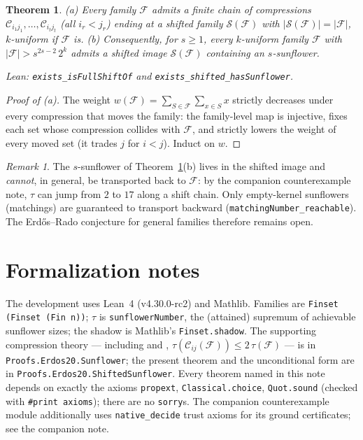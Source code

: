 \documentclass[11pt,a4paper]{article}
\newtheorem{theorem}{Theorem}
\theoremstyle{remark}
\newtheorem{remark}{Remark}
\newcommand{\cC}{\mathcal{C}}
\newcommand{\cF}{\mathcal{F}}
\newcommand{\cS}{\mathcal{S}}
\begin{document}
\begin{theorem}\label{thm:uncond}
\emph{(a)} Every family $\cF$ admits a finite chain of compressions
$\cC_{i_1j_1},\dots,\cC_{i_tj_t}$ (all $i_r<j_r$) ending at a shifted
family $\cS(\cF)$ with $|\cS(\cF)|=|\cF|$, $k$-uniform if $\cF$ is.
\emph{(b)} Consequently, for $s\ge1$, every $k$-uniform family $\cF$
with $|\cF|>s^{2s-2}\,2^{k}$ admits a shifted image $\cS(\cF)$
containing an $s$-sunflower.

\noindent\emph{Lean:} \texttt{exists\_isFullShiftOf} and
\texttt{exists\_shifted\_hasSunflower}.
\end{theorem}

\begin{proof}[Proof of (a)]
The weight $w(\cF)=\sum_{S\in\cF}\sum_{x\in S}x$ strictly decreases
under every compression that moves the family: the family-level map is
injective, fixes each set whose compression collides with $\cF$, and
strictly lowers the weight of every moved set (it trades $j$ for
$i<j$). Induct on $w$.
\end{proof}

\begin{remark}
The $s$-sunflower of Theorem~\ref{thm:uncond}(b) lives in the shifted
image and \emph{cannot}, in general, be transported back to $\cF$: by
the companion counterexample note, $\tau$ can jump from $2$ to $17$
along a shift chain. Only empty-kernel sunflowers (matchings) are
guaranteed to transport backward
(\texttt{matchingNumber\_reachable}). The Erd\H{o}s--Rado conjecture
for general families therefore remains open.
\end{remark}

\section{Formalization notes}\label{sec:formal}

The development uses Lean~4 (v4.30.0-rc2) and Mathlib. Families are
\texttt{Finset (Finset (Fin n))}; $\tau$ is
\texttt{sunflowerNumber}, the (attained) supremum of achievable
sunflower sizes; the shadow is Mathlib's \texttt{Finset.shadow}. The
supporting compression theory --- including
\cite[Lemma~1(i)--(iii)]{Mi26} and \cite[Lemma~2]{Mi26},
$\tau(\cC_{ij}(\cF))\le2\,\tau(\cF)$ --- is in
\texttt{Proofs.Erdos20.Sunflower}; the present theorem and the
unconditional form are in \texttt{Proofs.Erdos20.ShiftedSunflower}.
Every theorem named in this note depends on exactly the axioms
\texttt{propext}, \texttt{Classical.choice}, \texttt{Quot.sound}
(checked with \texttt{\#print axioms}); there are no \texttt{sorry}s.
The companion counterexample module additionally uses
\texttt{native\_decide} trust axioms for its ground certificates; see
the companion note.
\end{document}
